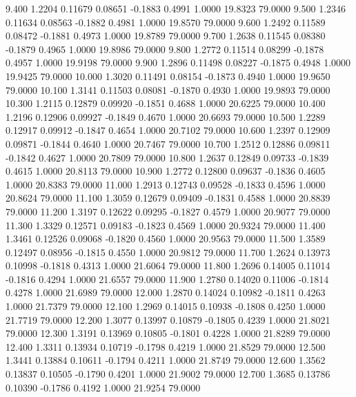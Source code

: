    9.400   1.2204   0.11679   0.08651  -0.1883   0.4991   1.0000  19.8323  79.0000
   9.500   1.2346   0.11634   0.08563  -0.1882   0.4981   1.0000  19.8570  79.0000
   9.600   1.2492   0.11589   0.08472  -0.1881   0.4973   1.0000  19.8789  79.0000
   9.700   1.2638   0.11545   0.08380  -0.1879   0.4965   1.0000  19.8986  79.0000
   9.800   1.2772   0.11514   0.08299  -0.1878   0.4957   1.0000  19.9198  79.0000
   9.900   1.2896   0.11498   0.08227  -0.1875   0.4948   1.0000  19.9425  79.0000
  10.000   1.3020   0.11491   0.08154  -0.1873   0.4940   1.0000  19.9650  79.0000
  10.100   1.3141   0.11503   0.08081  -0.1870   0.4930   1.0000  19.9893  79.0000
  10.300   1.2115   0.12879   0.09920  -0.1851   0.4688   1.0000  20.6225  79.0000
  10.400   1.2196   0.12906   0.09927  -0.1849   0.4670   1.0000  20.6693  79.0000
  10.500   1.2289   0.12917   0.09912  -0.1847   0.4654   1.0000  20.7102  79.0000
  10.600   1.2397   0.12909   0.09871  -0.1844   0.4640   1.0000  20.7467  79.0000
  10.700   1.2512   0.12886   0.09811  -0.1842   0.4627   1.0000  20.7809  79.0000
  10.800   1.2637   0.12849   0.09733  -0.1839   0.4615   1.0000  20.8113  79.0000
  10.900   1.2772   0.12800   0.09637  -0.1836   0.4605   1.0000  20.8383  79.0000
  11.000   1.2913   0.12743   0.09528  -0.1833   0.4596   1.0000  20.8624  79.0000
  11.100   1.3059   0.12679   0.09409  -0.1831   0.4588   1.0000  20.8839  79.0000
  11.200   1.3197   0.12622   0.09295  -0.1827   0.4579   1.0000  20.9077  79.0000
  11.300   1.3329   0.12571   0.09183  -0.1823   0.4569   1.0000  20.9324  79.0000
  11.400   1.3461   0.12526   0.09068  -0.1820   0.4560   1.0000  20.9563  79.0000
  11.500   1.3589   0.12497   0.08956  -0.1815   0.4550   1.0000  20.9812  79.0000
  11.700   1.2624   0.13973   0.10998  -0.1818   0.4313   1.0000  21.6064  79.0000
  11.800   1.2696   0.14005   0.11014  -0.1816   0.4294   1.0000  21.6557  79.0000
  11.900   1.2780   0.14020   0.11006  -0.1814   0.4278   1.0000  21.6989  79.0000
  12.000   1.2870   0.14024   0.10982  -0.1811   0.4263   1.0000  21.7379  79.0000
  12.100   1.2969   0.14015   0.10938  -0.1808   0.4250   1.0000  21.7719  79.0000
  12.200   1.3077   0.13997   0.10879  -0.1805   0.4239   1.0000  21.8021  79.0000
  12.300   1.3191   0.13969   0.10805  -0.1801   0.4228   1.0000  21.8289  79.0000
  12.400   1.3311   0.13934   0.10719  -0.1798   0.4219   1.0000  21.8529  79.0000
  12.500   1.3441   0.13884   0.10611  -0.1794   0.4211   1.0000  21.8749  79.0000
  12.600   1.3562   0.13837   0.10505  -0.1790   0.4201   1.0000  21.9002  79.0000
  12.700   1.3685   0.13786   0.10390  -0.1786   0.4192   1.0000  21.9254  79.0000
